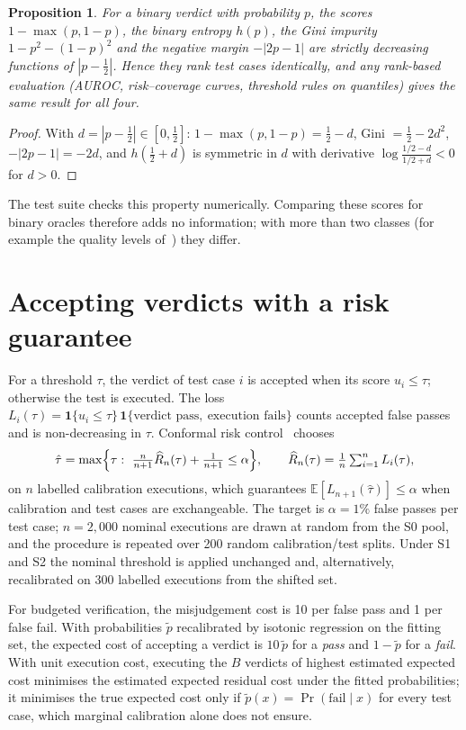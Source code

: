 \documentclass[10pt,a4paper]{article}
\newtheorem{proposition}{Proposition}
\begin{document}
\begin{proposition}
For a binary verdict with probability $p$, the scores $1-\max(p,1-p)$, the binary entropy $h(p)$, the Gini impurity $1-p^2-(1-p)^2$ and the negative margin $-|2p-1|$ are strictly decreasing functions of $|p-\tfrac12|$. Hence they rank test cases identically, and any rank-based evaluation (AUROC, risk--coverage curves, threshold rules on quantiles) gives the same result for all four.
\end{proposition}
\begin{proof}
With $d=|p-\tfrac12|\in[0,\tfrac12]$: $1-\max(p,1-p)=\tfrac12-d$, Gini $=\tfrac12-2d^2$, $-|2p-1|=-2d$, and $h(\tfrac12+d)$ is symmetric in $d$ with derivative $\log\frac{1/2-d}{1/2+d}<0$ for $d>0$.
\end{proof}
The test suite checks this property numerically. Comparing these scores for binary oracles therefore adds no information; with more than two classes (for example the quality levels of~\cite{visor2026}) they differ.

\section{Accepting verdicts with a risk guarantee}
For a threshold $\tau$, the verdict of test case $i$ is accepted when its score $u_i\le\tau$; otherwise the test is executed. The loss $L_i(\tau)=\mathbf 1\{u_i\le\tau\}\,\mathbf 1\{\text{verdict pass},\ \text{execution fails}\}$ counts accepted false passes and is non-decreasing in $\tau$. Conformal risk control~\cite{crc2024} chooses
\[
\hat\tau=\max\Bigl\{\tau:\ \tfrac{n}{n+1}\widehat R_n(\tau)+\tfrac{1}{n+1}\le\alpha\Bigr\},\qquad \widehat R_n(\tau)=\tfrac1n\textstyle\sum_{i=1}^n L_i(\tau),
\]
on $n$ labelled calibration executions, which guarantees $\mathbb E[L_{n+1}(\hat\tau)]\le\alpha$ when calibration and test cases are exchangeable. The target is $\alpha=1\%$ false passes per test case; $n=2{,}000$ nominal executions are drawn at random from the S0 pool, and the procedure is repeated over 200 random calibration/test splits. Under S1 and S2 the nominal threshold is applied unchanged and, alternatively, recalibrated on 300 labelled executions from the shifted set.

For budgeted verification, the misjudgement cost is 10 per false pass and 1 per false fail. With probabilities $\tilde p$ recalibrated by isotonic regression on the fitting set, the expected cost of accepting a verdict is $10\,\tilde p$ for a \emph{pass} and $1-\tilde p$ for a \emph{fail}. With unit execution cost, executing the $B$ verdicts of highest estimated expected cost minimises the estimated expected residual cost under the fitted probabilities; it minimises the true expected cost only if $\tilde p(x)=\Pr(\text{fail}\mid x)$ for every test case, which marginal calibration alone does not ensure.
\end{document}

